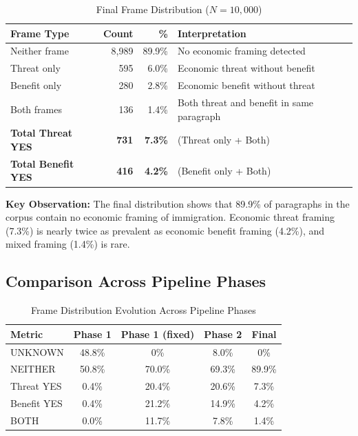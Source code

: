 \begin{table}[H]
\centering
\caption{Final Frame Distribution ($N = 10{,}000$)}
\label{tab:final_distribution}
\begin{tabular}{@{}lrrp{6cm}@{}}
\toprule
\textbf{Frame Type} & \textbf{Count} & \textbf{\%} & \textbf{Interpretation} \\
\midrule
Neither frame   & 8,989 & 89.9\% & No economic framing detected \\
Threat only     &   595 &  6.0\% & Economic threat without benefit \\
Benefit only    &   280 &  2.8\% & Economic benefit without threat \\
Both frames     &   136 &  1.4\% & Both threat and benefit in same paragraph \\
\midrule
\textbf{Total Threat YES}  & \textbf{731}  & \textbf{7.3\%} & (Threat only + Both) \\
\textbf{Total Benefit YES} & \textbf{416}  & \textbf{4.2\%} & (Benefit only + Both) \\
\bottomrule
\end{tabular}
\end{table}

\textbf{Key Observation:} The final distribution shows that 89.9\% of paragraphs in the corpus contain no economic framing of immigration. Economic threat framing (7.3\%) is nearly twice as prevalent as economic benefit framing (4.2\%), and mixed framing (1.4\%) is rare.

\subsection{Comparison Across Pipeline Phases}

\begin{table}[H]
\centering
\caption{Frame Distribution Evolution Across Pipeline Phases}
\label{tab:phase_comparison}
\begin{tabular}{@{}lcccc@{}}
\toprule
\textbf{Metric} & \textbf{Phase 1} & \textbf{Phase 1 (fixed)} & \textbf{Phase 2} & \textbf{Final} \\
\midrule
UNKNOWN       & 48.8\% & 0\%    & 8.0\%  & 0\% \\
NEITHER       & 50.8\% & 70.0\% & 69.3\% & 89.9\% \\
Threat YES    & 0.4\%  & 20.4\% & 20.6\% & 7.3\% \\
Benefit YES   & 0.4\%  & 21.2\% & 14.9\% & 4.2\% \\
BOTH          & 0.0\%  & 11.7\% & 7.8\%  & 1.4\% \\
\bottomrule
\end{tabular}
\end{table}

